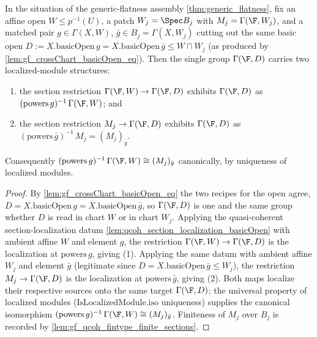 \begin{lemma}
  \label{lem:gf_section_localization_twoleg}
  In the situation of the generic-flatness assembly \cref{thm:generic_flatness}, fix an affine open
  \(W \le p^{-1}(U)\), a patch \(W_j = \Spec B_j\) with \(M_j = \Gamma(\F, W_j)\), and a matched
  pair \(g \in \Gamma(X, W)\), \(\bar g \in B_j = \Gamma(X, W_j)\) cutting out the same basic open
  \(D := X.\mathrm{basicOpen}\,g = X.\mathrm{basicOpen}\,\bar g \le W \sqcap W_j\) (as produced by
  \cref{lem:gf_crossChart_basicOpen_eq}). Then the single group \(\Gamma(\F, D)\) carries two
  localized-module structures:
  \begin{enumerate}
    \item the section restriction \(\Gamma(\F, W) \to \Gamma(\F, D)\) exhibits \(\Gamma(\F, D)\) as
      \((\mathrm{powers}\,g)^{-1}\,\Gamma(\F, W)\); and
    \item the section restriction \(M_j \to \Gamma(\F, D)\) exhibits \(\Gamma(\F, D)\) as
      \((\mathrm{powers}\,\bar g)^{-1}\,M_j = (M_j)_{\bar g}\).
  \end{enumerate}
  Consequently \((\mathrm{powers}\,g)^{-1}\,\Gamma(\F, W) \cong (M_j)_{\bar g}\) canonically, by
  uniqueness of localized modules.
\end{lemma}

\begin{proof}
        \leanok
  By \cref{lem:gf_crossChart_basicOpen_eq} the two recipes for the open agree,
  \(D = X.\mathrm{basicOpen}\,g = X.\mathrm{basicOpen}\,\bar g\), so \(\Gamma(\F, D)\) is one and the
  same group whether \(D\) is read in chart \(W\) or in chart \(W_j\). Applying the quasi-coherent
  section-localization datum \cref{lem:qcoh_section_localization_basicOpen} with ambient affine \(W\)
  and element \(g\), the restriction \(\Gamma(\F, W) \to \Gamma(\F, D)\) is the localization at
  \(\mathrm{powers}\,g\), giving (1). Applying the same datum with ambient affine \(W_j\) and element
  \(\bar g\) (legitimate since \(D = X.\mathrm{basicOpen}\,\bar g \le W_j\)), the restriction
  \(M_j \to \Gamma(\F, D)\) is the localization at \(\mathrm{powers}\,\bar g\), giving (2). Both maps
  localize their respective sources onto the same target \(\Gamma(\F, D)\); the universal property of
  localized modules (\(\mathrm{IsLocalizedModule.iso}\) uniqueness) supplies the canonical isomorphism
  \((\mathrm{powers}\,g)^{-1}\,\Gamma(\F, W) \cong (M_j)_{\bar g}\). Finiteness of \(M_j\) over \(B_j\)
  is recorded by \cref{lem:gf_qcoh_fintype_finite_sections}.
\end{proof}

